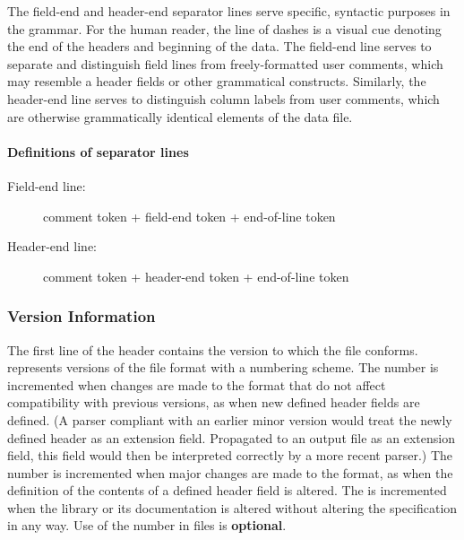 \documentclass{article}
\begin{document}
The field-end and header-end separator lines serve specific, syntactic
purposes in the {\xdi} grammar. For the human reader, the line of
dashes is a visual cue denoting the end of the headers and beginning
of the data. The field-end line serves to separate and distinguish
field lines from freely-formatted user comments, which may resemble a
header fields or other grammatical constructs. Similarly, the
header-end line serves to distinguish column labels from user
comments, which are otherwise grammatically identical elements of the
data file.


\paragraph{Definitions of separator lines}
\begin{description}
\item[Field-end line:] comment token + field-end token + end-of-line
  token\\\qquad\xditt{\# /////////////}
\item[Header-end line:] comment token + header-end token + end-of-line
  token\\\qquad\xditt{\# -------------}
\end{description}




\subsubsection{Version Information}
\label{sec:def_hdr_version}

The first line of the {\xdi} header contains the {\xdi} version to
which the file conforms.  {\xdi} represents versions of the file format
with a  numbering scheme. The
 number is incremented when changes are made to
the format that do not affect compatibility with previous versions, as
when new defined header fields are defined.  (A parser compliant with
an earlier minor version would treat the newly defined header as an
extension field.  Propagated to an output file as an extension field,
this field would then be interpreted correctly by a more recent
parser.)  The  number is incremented when major
changes are made to the format, as when the definition of the contents
of a defined header field is altered.  The  is
incremented when the library or its documentation is altered without
altering the specification in any way.  Use of the 
number in {\xdi} files is \textbf{optional}.
\end{document}

